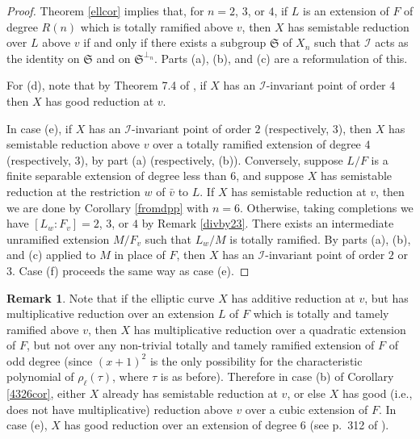 \documentclass{amsart}
\def\I{{\mathcal I}}
\def\s{{\mathfrak S}}
\theoremstyle{definition}
\newtheorem{rem}[thm]{Remark}
\begin{document}
\begin{proof}
Theorem \ref{ellcor} implies that, for $n = 2$, $3$, or $4$, 
if $L$ is an extension of $F$ of degree $R(n)$ which 
is totally ramified above $v$, then 
$X$ has semistable reduction over $L$ above $v$ if and only if 
there exists a subgroup $\s$ of $X_n$ such 
that $\I$ acts as the identity on $\s$ and on $\s^{\perp_n}$.
Parts (a), (b), and (c) are a reformulation of this.

For (d), note that by Theorem 7.4 of \cite{semistab}, if $X$
has an $\I$-invariant point of order $4$ then $X$ has good
reduction at $v$.

In case (e),
if $X$ has an $\I$-invariant point of order $2$ (respectively, $3$),
then $X$ has semistable reduction above $v$ over a totally ramified  
extension of degree $4$ (respectively, $3$), by 
part (a) (respectively, (b)). 
Conversely, suppose $L/F$ is a finite separable extension 
of degree less than $6$, and suppose
$X$ has semistable reduction at the restriction $w$ of ${\bar 
v}$ to $L$.
If $X$ has semistable reduction at $v$, then we are done by 
Corollary \ref{fromdpp} with $n = 6$.
Otherwise, taking completions we have
$[L_{w}:F_{v}] = 2$, $3$, or $4$ 
by Remark \ref{divby23}.
There exists an intermediate
unramified extension $M/F_{v}$ such that $L_{w}/M$ is totally
ramified. 
By parts (a), (b), and (c) applied to $M$ in place of $F$, then 
$X$ has an $\I$-invariant point of order $2$ or $3$.
Case (f) proceeds the same way as case (e). 
\end{proof}

\begin{rem}
Note that if the elliptic curve $X$ has additive reduction at $v$,
but has multiplicative reduction over an extension $L$ of $F$ which
is totally and tamely ramified above $v$, then $X$ has
multiplicative reduction over a quadratic extension of $F$, but
not over any non-trivial 
totally and tamely ramified extension of $F$ of odd degree  
(since $(x+1)^2$ is the only possibility for the characteristic
polynomial of $\rho_\ell(\tau)$, where $\tau$ is as before).
Therefore in case (b) of Corollary \ref{4326cor}, 
either $X$ already has semistable reduction at $v$, 
or else $X$ has good 
(i.e., does not have multiplicative) 
reduction above $v$ over a cubic extension of $F$.
In case (e), $X$ has good reduction over an extension of degree $6$
(see p.~312 of \cite{Serre72}).
\end{rem}
\end{document}
